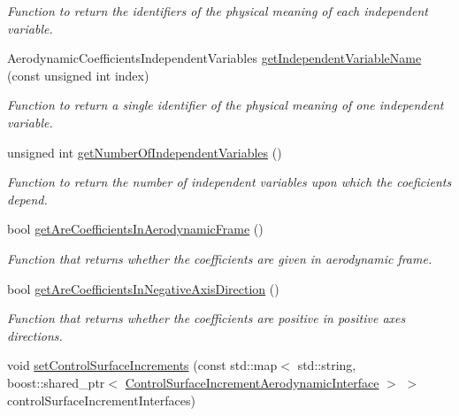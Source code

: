 \begin{DoxyCompactItemize}
\begin{DoxyCompactList}\small\item\em Function to return the identifiers of the physical meaning of each independent variable. \end{DoxyCompactList}\item 
Aerodynamic\+Coefficients\+Independent\+Variables \hyperlink{classtudat_1_1aerodynamics_1_1AerodynamicCoefficientInterface_a91798427fd03d66a696f97f9c01292c4}{get\+Independent\+Variable\+Name} (const unsigned int index)
\begin{DoxyCompactList}\small\item\em Function to return a single identifier of the physical meaning of one independent variable. \end{DoxyCompactList}\item 
unsigned int \hyperlink{classtudat_1_1aerodynamics_1_1AerodynamicCoefficientInterface_af10cc21f485df4f2c877f827c7a38493}{get\+Number\+Of\+Independent\+Variables} ()
\begin{DoxyCompactList}\small\item\em Function to return the number of independent variables upon which the coeficients depend. \end{DoxyCompactList}\item 
bool \hyperlink{classtudat_1_1aerodynamics_1_1AerodynamicCoefficientInterface_acc664214ae5fee886b3a2ffa22dce2d9}{get\+Are\+Coefficients\+In\+Aerodynamic\+Frame} ()
\begin{DoxyCompactList}\small\item\em Function that returns whether the coefficients are given in aerodynamic frame. \end{DoxyCompactList}\item 
bool \hyperlink{classtudat_1_1aerodynamics_1_1AerodynamicCoefficientInterface_a55875655a4a678eaa5fdb80cb4827e9f}{get\+Are\+Coefficients\+In\+Negative\+Axis\+Direction} ()
\begin{DoxyCompactList}\small\item\em Function that returns whether the coefficients are positive in positive axes directions. \end{DoxyCompactList}\item 
void \hyperlink{classtudat_1_1aerodynamics_1_1AerodynamicCoefficientInterface_a8bfd4247c0ac5d32c92b9ad859f33500}{set\+Control\+Surface\+Increments} (const std\+::map$<$ std\+::string, boost\+::shared\+\_\+ptr$<$ \hyperlink{classtudat_1_1aerodynamics_1_1ControlSurfaceIncrementAerodynamicInterface}{Control\+Surface\+Increment\+Aerodynamic\+Interface} $>$ $>$ control\+Surface\+Increment\+Interfaces)

\end{DoxyCompactItemize}
